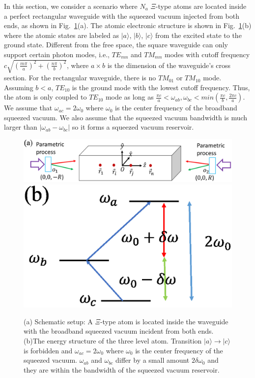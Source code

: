 \documentclass[aps,showpacs,twocolumn,twoside,groupedaddress]{revtex4}
\begin{document}
In this section, we consider a scenario where $N_a$ $\Xi$-type atoms are located inside a perfect rectangular waveguide with the squeezed vacuum injected from both ends, as shown in Fig.~\ref{1}(a). The atomic electronic structure is shown in Fig.~\ref{1}(b) where the atomic states are labeled as $|a\rangle$, $|b\rangle$, $|c\rangle$ from the excited state to the ground state. Different from the free space, the square waveguide can only support certain photon modes, i.e., $TE_{mn}$ and $TM_{mn}$ modes with cutoff frequency $c\sqrt{(\frac{m\pi}{a})^{2}+(\frac{n\pi}{b})^{2}}$, where $a \times b$ is the dimension of the waveguide's cross section. For the rectangular waveguide, there is no $TM_{01}$ or $TM_{10}$ mode. Assuming $b<a$, $TE_{10}$ is the ground mode with the lowest cutoff frequency. Thus, the atom is only coupled to $TE_{10}$ mode as long as $\frac{\pi c}{a}<\omega_{ab},\omega_{bc}<min(\frac{\pi c}{b},\frac{2\pi c}{a})$. We assume that $\omega_{ac}=2\omega_0$ where $\omega_0$ is the center frequency of the broadband squeezed vacuum. We also assume that the squeezed vacuum bandwidth is much larger than $|\omega_{ab}-\omega_{bc}|$ so it forms a squeezed vacuum reservoir. 
\begin{figure}
\includegraphics[width=1.5\columnwidth]{fig1.eps}
\includegraphics[width=0.5\columnwidth]{fig2.eps}
\caption{(a) Schematic setup: A $\Xi$-type atom is located inside the waveguide with the broadband squeezed vacuum incident from both ends. (b)The energy structure of the three level atom. Transition $|a\rangle\rightarrow|c\rangle$ is forbidden and $\omega_{ac}=2\omega_0$ where $\omega_0$ is the center frequency of the squeezed vacuum. $\omega_{ab}$ and $\omega_{bc}$ differ by a small amount $2\delta\omega_0$ and they are within the bandwidth of the squeezed vacuum reservoir.}
\label{1}
\end{figure}
\end{document}

